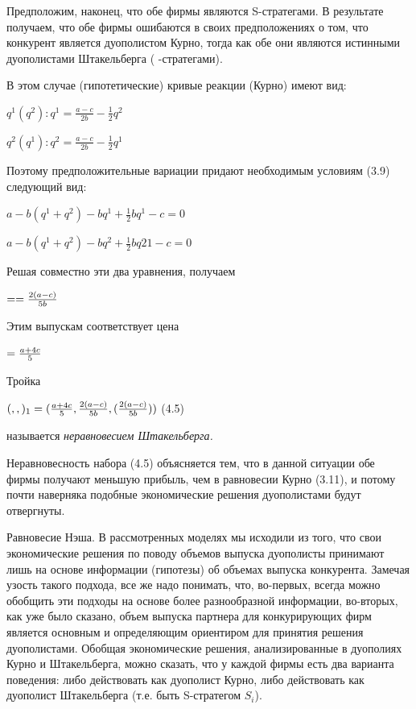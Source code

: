 \documentclass[12pt, 4paper]{book}
\begin{document}
{Предположим, наконец, что обе фирмы являются S-стратегами. В результате получаем, что обе фирмы ошибаются в своих предположениях о том, что конкурент является дуополистом Курно, тогда как обе они являются истинными дуополистами Штакельберга ( -стратегами).
\par

В этом случае (гипотетические) кривые реакции (Курно) имеют вид:
\begin{center}
$q^1(q^2):q^1=\frac{a-c}{2b} - \frac{1}{2}q^2$
\end{center}
\begin{center}
$q^2(q^1):q^2=\frac{a-c}{2b} - \frac{1}{2}q^1$
\end{center}
\par

Поэтому предположительные вариации придают необходимым условиям (3.9) следующий вид:
\begin{center}
$a-b(q^1 + q^2)-bq^1 + \frac{1}{2}b q^1 - c = 0$
\end{center}
\begin{center}
$a-b(q^1 + q^2)-bq^2 + \frac{1}{2}b q21 - c = 0$
\end{center}
\par

Решая совместно эти два уравнения, получаем
\begin{center}
$\title{q^1}=\title{q^2}=\frac{2(a-c)}{5b}$
\end{center}
Этим выпускам соответствует цена
\begin{center}
$\title{p} = \frac{a +4c}{5}$
\end{center}
Тройка 
\begin{center}
$(\title{p},\title{q^1},\title{q^2})_1=(\frac{a+4c}{5},\frac{2(a-c)}{5b},(\frac{2(a-c)}{5b})) $ (4.5)
\end{center}
называется \textit{неравновесием Штакельберга.}
\par

Неравновесность набора (4.5) объясняется тем, что в данной ситуации обе фирмы получают меньшую прибыль, чем в равновесии Курно (3.11), и потому почти наверняка подобные экономические решения дуополистами будут отвергнуты.
\par

Равновесие Нэша. В рассмотренных моделях мы исходили из того, что свои экономические решения по поводу объемов выпуска дуополисты принимают лишь на основе информации (гипотезы) об объемах выпуска конкурента. Замечая узость такого подхода, все же надо понимать, что, во-первых, всегда можно обобщить эти подходы на основе более разнообразной информации, во-вторых, как уже было сказано, объем выпуска партнера для конкурирующих фирм является основным и определяющим ориентиром для принятия решения дуополистами.
Обобщая экономические решения, анализированные в дуополиях Курно и Штакельберга, можно сказать, что у каждой фирмы есть два варианта поведения: либо действовать как дуополист Курно, либо действовать как дуополист Штакельберга (т.е. быть S-стратегом $S_i$).
\par

}
\end{document}
